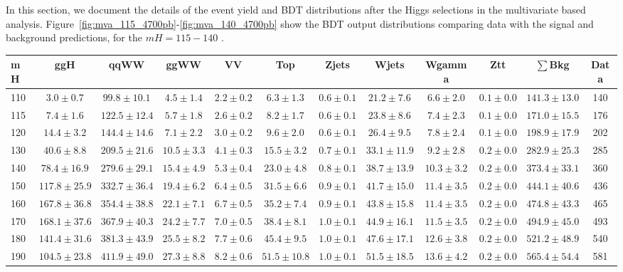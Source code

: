 In this section, we document the details of the event yield and BDT 
distributions after the Higgs selections in the multivariate based analysis. 
Figure~\ref{fig:mva_115_4700pb}-\ref{fig:mva_140_4700pb} show the BDT 
output distributions comparing data with the signal and background predictions, for 
the $mH=115-140$ \GeVcc.


\begin{table}[!ht]
{%
 \tiny
 \begin{center}
 \begin{tabular}{l c c c c c c c c c c c }
 \hline
 mH & ggH & qqWW & ggWW & VV & Top & Zjets & Wjets & Wgamma & Ztt & $\sum$Bkg & Data \\
 \hline
110 & $3.0\pm0.7$ & $99.8\pm10.1$ & $4.5\pm1.4$ & $2.2\pm0.2$ & $6.3\pm1.3$ & $0.6\pm0.1$ & $21.2\pm7.6$ & $6.6\pm2.0$ & $0.1\pm0.0$ & $141.3\pm13.0$ & 140 \\
115 & $7.4\pm1.6$ & $122.5\pm12.4$ & $5.7\pm1.8$ & $2.6\pm0.2$ & $8.2\pm1.7$ & $0.6\pm0.1$ & $23.8\pm8.6$ & $7.4\pm2.3$ & $0.1\pm0.0$ & $171.0\pm15.5$ & 176 \\
120 & $14.4\pm3.2$ & $144.4\pm14.6$ & $7.1\pm2.2$ & $3.0\pm0.2$ & $9.6\pm2.0$ & $0.6\pm0.1$ & $26.4\pm9.5$ & $7.8\pm2.4$ & $0.1\pm0.0$ & $198.9\pm17.9$ & 202 \\
130 & $40.6\pm8.8$ & $209.5\pm21.6$ & $10.5\pm3.3$ & $4.1\pm0.3$ & $15.5\pm3.2$ & $0.7\pm0.1$ & $33.1\pm11.9$ & $9.2\pm2.8$ & $0.2\pm0.0$ & $282.9\pm25.3$ & 285 \\
140 & $78.4\pm16.9$ & $279.6\pm29.1$ & $15.4\pm4.9$ & $5.3\pm0.4$ & $23.0\pm4.8$ & $0.8\pm0.1$ & $38.7\pm13.9$ & $10.3\pm3.2$ & $0.2\pm0.0$ & $373.4\pm33.1$ & 360 \\
150 & $117.8\pm25.9$ & $332.7\pm36.4$ & $19.4\pm6.2$ & $6.4\pm0.5$ & $31.5\pm6.6$ & $0.9\pm0.1$ & $41.7\pm15.0$ & $11.4\pm3.5$ & $0.2\pm0.0$ & $444.1\pm40.6$ & 436 \\
160 & $167.8\pm36.8$ & $354.4\pm38.8$ & $22.1\pm7.1$ & $6.7\pm0.5$ & $35.2\pm7.4$ & $0.9\pm0.1$ & $43.8\pm15.8$ & $11.4\pm3.5$ & $0.2\pm0.0$ & $474.8\pm43.3$ & 465 \\
170 & $168.1\pm37.6$ & $367.9\pm40.3$ & $24.2\pm7.7$ & $7.0\pm0.5$ & $38.4\pm8.1$ & $1.0\pm0.1$ & $44.9\pm16.1$ & $11.5\pm3.5$ & $0.2\pm0.0$ & $494.9\pm45.0$ & 493 \\
180 & $141.4\pm31.6$ & $381.3\pm43.9$ & $25.5\pm8.2$ & $7.7\pm0.6$ & $45.4\pm9.5$ & $1.0\pm0.1$ & $47.6\pm17.1$ & $12.6\pm3.8$ & $0.2\pm0.0$ & $521.2\pm48.9$ & 540 \\
190 & $104.5\pm23.8$ & $411.9\pm49.0$ & $27.3\pm8.8$ & $8.2\pm0.6$ & $51.5\pm10.8$ & $1.0\pm0.1$ & $51.5\pm18.5$ & $13.6\pm4.2$ & $0.2\pm0.0$ & $565.4\pm54.4$ & 581 \\

\end{tabular}
\end{center}}
\end{table}
